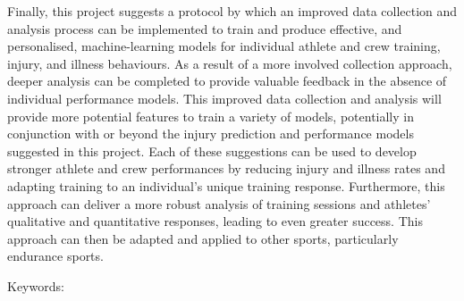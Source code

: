 Finally, this project suggests a protocol by which an improved data collection and analysis process can be implemented to train and produce effective, and personalised, machine-learning models for individual athlete and crew training, injury, and illness behaviours. As a result of a more involved collection approach, deeper analysis can be completed to provide valuable feedback in the absence of individual performance models. This improved data collection and analysis will provide more potential features to train a variety of models, potentially in conjunction with or beyond the injury prediction and performance models suggested in this project. Each of these suggestions can be used to develop stronger athlete and crew performances by reducing injury and illness rates and adapting training to an individual's unique training response. Furthermore, this approach can deliver a more robust analysis of training sessions and athletes' qualitative and quantitative responses, leading to even greater success. This approach can then be adapted and applied to other sports, particularly endurance sports.

Keywords: \keywords 